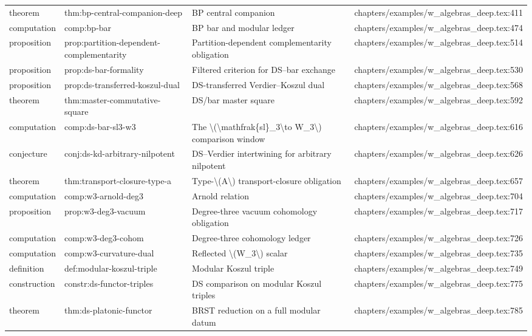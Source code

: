 \documentclass[11pt]{article}
\begin{document}
\begin{longtable}{L{0.10\textwidth}L{0.26\textwidth}L{0.42\textwidth}L{0.22\textwidth}}
theorem & thm:bp-central-companion-deep & BP central companion & chapters/examples/w\_algebras\_deep.tex:411\\
computation & comp:bp-bar & BP bar and modular led{}ger & chapters/examples/w\_algebras\_deep.tex:474\\
proposition & prop:partition-dependent-complementarity & Partition-dependent complementarity obligation & chapters/examples/w\_algebras\_deep.tex:514\\
proposition & prop:ds-bar-formality & Filtered criterion for DS--bar exchange & chapters/examples/w\_algebras\_deep.tex:530\\
proposition & prop:ds-transferred-koszul-dual & DS-transferred Verdier--Koszul dual & chapters/examples/w\_algebras\_deep.tex:568\\
theorem & thm:master-commutative-square & DS/bar master square & chapters/examples/w\_algebras\_deep.tex:592\\
computation & comp:ds-bar-sl3-w3 & The \textbackslash{}(\textbackslash{}mathfrak\{sl\}\_3\textbackslash{}to W\_3\textbackslash{}) comparison window & chapters/examples/w\_algebras\_deep.tex:616\\
conjecture & conj:ds-kd-arbitrary-nilpotent & DS--Verdier intertwining for arbitrary nilpotent & chapters/examples/w\_algebras\_deep.tex:626\\
theorem & thm:transport-closure-type-a & Type-\textbackslash{}(A\textbackslash{}) transport-closure obligation & chapters/examples/w\_algebras\_deep.tex:657\\
computation & comp:w3-arnold-deg3 & Arnold relation & chapters/examples/w\_algebras\_deep.tex:704\\
proposition & prop:w3-deg3-vacuum & Degree-three vacuum cohomology obligation & chapters/examples/w\_algebras\_deep.tex:717\\
computation & comp:w3-deg3-cohom & Degree-three cohomology led{}ger & chapters/examples/w\_algebras\_deep.tex:726\\
computation & comp:w3-curvature-dual & Reflected \textbackslash{}(W\_3\textbackslash{}) scalar & chapters/examples/w\_algebras\_deep.tex:735\\
definition & def:modular-koszul-triple & Modular Koszul triple & chapters/examples/w\_algebras\_deep.tex:749\\
construction & constr:ds-functor-triples & DS comparison on modular Koszul triples & chapters/examples/w\_algebras\_deep.tex:775\\
theorem & thm:ds-platonic-functor & BRST reduction on a full modular datum & chapters/examples/w\_algebras\_deep.tex:785\\

\end{longtable}
\end{document}
